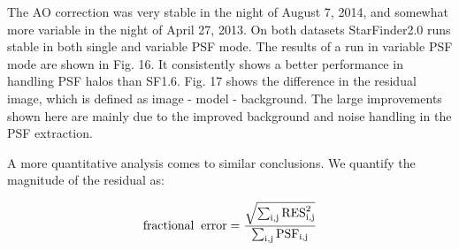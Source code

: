 The AO correction was very stable in the night of August 7, 2014, and somewhat more variable in the night of April 27, 2013. On both datasets StarFinder2.0 runs stable in both single and variable PSF mode. The results of a run in variable PSF mode are shown in Fig. 16. It consistently shows a better performance in handling PSF halos than SF1.6. Fig. 17 shows the difference in the residual image, which is defined as image - model - background. The large improvements shown here are mainly due to the improved background and noise handling in the PSF extraction.

A more quantitative analysis comes to similar conclusions. We quantify the magnitude of the residual as:

\begin{equation}
\rm{fractional \; \; error} = \frac{\sqrt{\sum_{i,j}\rm{RES}^2_{i,j}}}{\sum_{i,j}\rm{PSF}_{i,j}}
\end{equation}
  
  
  
  
  
  
  
  